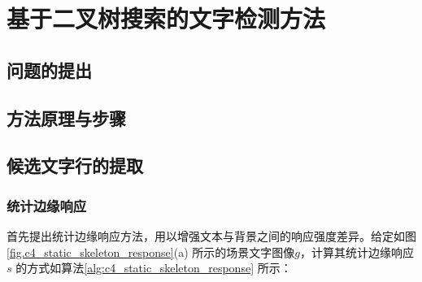 ﻿%
%
%
%
%
%

\chapter{基于二叉树搜索的文字检测方法}

    \section{问题的提出}

    \section{方法原理与步骤}



    \section{候选文字行的提取}

        \subsection{统计边缘响应}

        首先提出统计边缘响应方法，用以增强文本与背景之间的响应强度差异。给定如图\ref{fig.c4_static_skeleton_response}(a) 所示的场景文字图像$g$，计算其统计边缘响应$s$ 的方式如算法\ref{alg:c4_static_skeleton_response} 所示：

